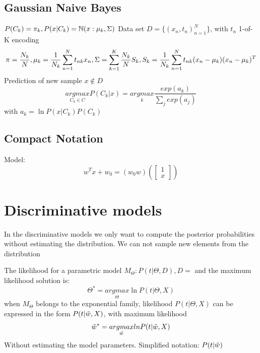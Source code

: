 \subsection{Gaussian Naive Bayes}
$P(C_{k}) = \pi_{k}, P(x|C_{k}) = \mathbb{N}(x: \mu_{k}, \Sigma)$
Data set $D = \{(x_{n}, t_{n})^{N}_{n=1}\}$, with $t_{n}$ 1-of-K encoding
\begin{equation}
    \pi = \frac{N_{k}}{N}, \\
    \mu_{k} = \frac{1}{N_{k}} \sum_{n=1}^{N}t_{nk}x_{n}, \\
    \Sigma = \sum_{k=1}^{K}\frac{N_k}{N}S_{k}, 
    S_{k} = \frac{1}{N_{k}} \sum_{n = 1}^{N} t_{nk}(x_{n} - \mu_{k})(x_{n} - \mu_{k})^{T}
\end{equation}
Prediction of new sample $x \not\in D$
\begin{equation}
    \underset{C_{k} \in C}{argmax} P(C_{k}|x) = \underset{k}{argmax}\frac{exp(a_{k})}{\sum_{j}exp(a_{j})}
\end{equation}
with $a_{k} = \ln P(x|C_{k}) P(C_{k})$

\subsection{Compact Notation}
Model:
\begin{equation}
    w^{T}x + w_{0} = (w_{0} w)(
    \begin{bmatrix} 
        1 \\
        x
    \end{bmatrix})
\end{equation}

\section{Discriminative models}
In the discriminative models we only want to compute the posterior probabilities without estimating the distribution. We can not sample new elements from the distribution

The likelihood for a parametric model $M_{\Theta}: P(t|\Theta, D), D = $ and the maximum likelihood solution is:
\begin{equation}
    \Theta^{*} = \underset{\Theta}{argmax}\ln P(t|\Theta, X)
\end{equation}
when $M _\Theta$ belongs to the exponential family, likelihood $P(t|\Theta, X)$ can be expressed in the form $P(t|\Tilde{w}, X)$, with maximum likelihood
\begin{equation}
    \Tilde{w}^{*} = \underset{\Tilde{w}}{argmax} ln P(t|\Tilde{w}, X)
\end{equation}
Without estimating the model parameters. Simplified notation: $P(t|\Tilde{w})$

